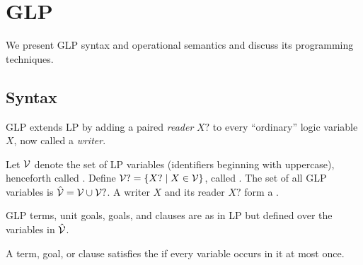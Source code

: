 \section{GLP}
\label{sec:glp}

We present GLP syntax and operational semantics and discuss its programming techniques.

\subsection{Syntax}
\label{sec:glp-ext}

GLP extends LP by adding a paired \emph{reader} $X?$ to every ``ordinary'' logic variable $X$, now called a \emph{writer}.

\begin{definition}
\label{def:glp-variables}
Let $\mathcal{V}$ denote the set of LP variables (identifiers beginning with uppercase), henceforth called . Define $\mathcal{V}? = \{X? \mid X \in \mathcal{V}\}$, called . The set of all GLP variables is $\hat{\mathcal{V}} = \mathcal{V} \cup \mathcal{V}?$. A writer $X$ and its reader $X?$ form a .
\end{definition}
GLP terms, unit goals, goals, and clauses are as in LP but defined over the variables in $\hat{\mathcal{V}}$.

\begin{definition}
\label{def:so-invariant}
A term, goal, or clause satisfies the  if every variable occurs in it at most once.
\end{definition}

